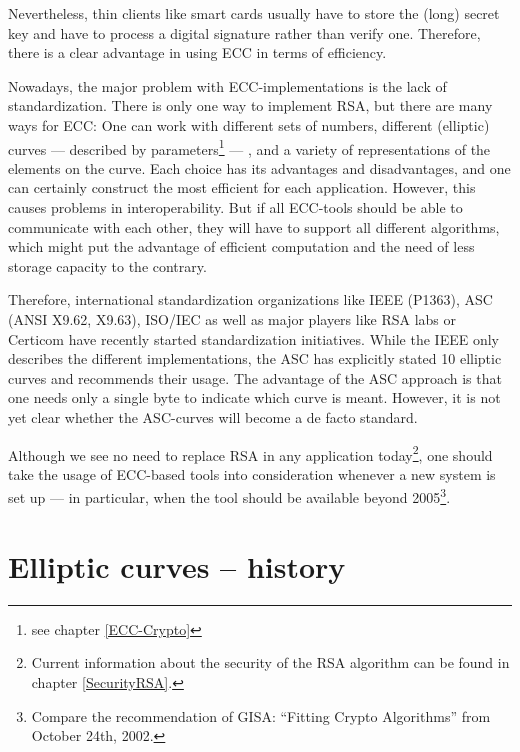 Nevertheless, thin clients like smart cards usually have to store the (long)
secret key and have to process a digital signature rather than verify one.
Therefore, there is a clear advantage in using ECC in terms of efficiency.
\par
\smallskip
Nowadays, the major problem with ECC-implementations is the lack of standardization.
There is only one way to implement RSA, but there are many ways for ECC: One can work with
different sets of numbers, different (elliptic) curves --- described by parameters\footnote{%
see chapter \ref{ECC-Crypto}
} --- ,
and a variety of representations of the elements on the curve. Each choice has its
advantages and disadvantages, and one can certainly construct the most efficient for
each application. However, this causes problems in interoperability. But if all
ECC-tools should be able to communicate with each other, they will have to support
all different algorithms, which might put the advantage of efficient computation and
the need of less storage capacity to the contrary.

Therefore, international standardization organizations like IEEE (P1363),
ASC (ANSI X9.62, X9.63), ISO/IEC as well as major players like RSA labs or
Certicom have recently started standardization initiatives. While the IEEE
only describes the different implementations, the ASC has explicitly stated
10 elliptic curves and recommends their usage. The advantage of the ASC
approach is that one needs only a single byte to indicate which curve is
meant. However, it is not yet clear whether the ASC-curves will become a de
facto standard.

Although we see no need to replace RSA in any application today\footnote{%
Current information about the security of the RSA algorithm can be found in 
chapter \ref{SecurityRSA}.}, one should
take the usage of ECC-based tools into consideration whenever a new system
is set up --- in particular, when the tool should be available beyond 2005\footnote{%
Compare the recommendation of GISA: ``Fitting Crypto Algorithms'' from October 24th, 2002.
}.


\section{Elliptic curves -- history}

